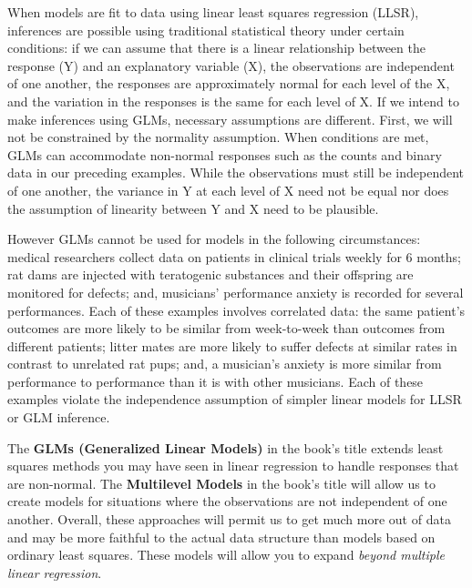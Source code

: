 \documentclass[
]{krantz}
\begin{document}
When models are fit to data using linear least squares regression (LLSR),  inferences are possible using traditional statistical theory under certain conditions: if we can assume that there is a linear relationship between the response (Y) and an explanatory variable (X), the observations are independent of one another, the responses are approximately normal for each level of the X, and the variation in the responses is the same for each level of X. If we intend to make inferences using GLMs, necessary assumptions are different. First, we will not be constrained by the normality assumption. When conditions are met, GLMs can accommodate non-normal responses such as the counts and binary data in our preceding examples. While the observations must still be independent of one another, the variance in Y at each level of X need not be equal nor does the assumption of linearity between Y and X need to be plausible.

However GLMs cannot be used for models in the following circumstances: medical researchers collect data on patients in clinical trials weekly for 6 months; rat dams are injected with teratogenic substances and their offspring are monitored for defects; and, musicians' performance anxiety is recorded for several performances. Each of these examples involves correlated data: the same patient's outcomes are more likely to be similar from week-to-week than outcomes from different patients; litter mates are more likely to suffer defects at similar rates in contrast to unrelated rat pups; and, a musician's anxiety is more similar from performance to performance than it is with other musicians. Each of these examples violate the independence assumption of simpler linear models for LLSR or GLM inference.

The \textbf{GLMs (Generalized Linear Models)}  in the book's title extends least squares methods you may have seen in linear regression to handle responses that are non-normal. The \textbf{Multilevel Models}  in the book's title will allow us to create models for situations where the observations are not independent of one another. Overall, these approaches will permit us to get much more out of data and may be more faithful to the actual data structure than models based on ordinary least squares. These models will allow you to expand \emph{beyond multiple linear regression}.
\end{document}
